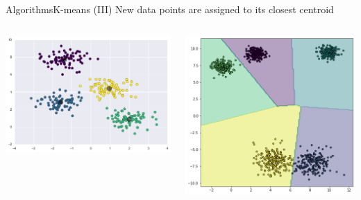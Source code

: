 \documentclass[10pt,compress]{beamer} %
\begin{document}
\begin{frame}{Algorithms}{K-means (III)}
    New data points are assigned to its closest centroid
    \begin{columns}
		\includegraphics[width=\textwidth]{figs/kmeans-2.png}

		\includegraphics[width=\textwidth]{figs/voronoi.png}
    \end{columns}
\end{frame}
\end{document}
